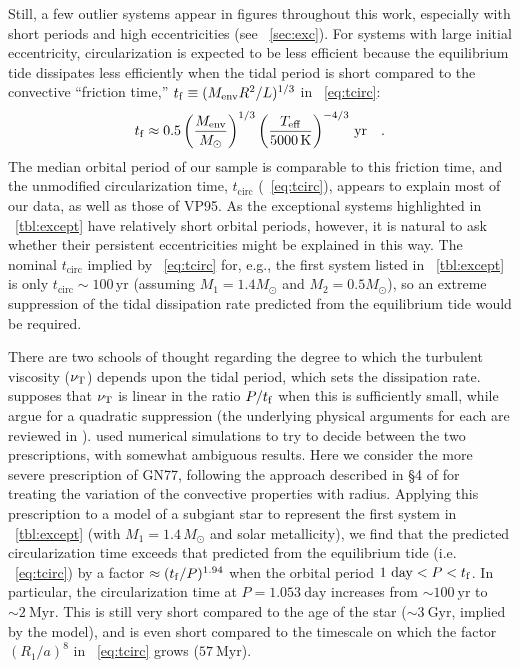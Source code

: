 \documentclass[modern, letterpaper]{aastex62}
\begin{document}
Still, a few outlier systems appear in figures throughout this work, especially with short periods and high eccentricities (see \sectionname~\ref{sec:exc}).
For systems with large initial eccentricity, circularization is expected to be less efficient because the equilibrium tide dissipates less efficiently when the tidal period is short compared to the convective ``friction time,'' $t_{\rm f}\equiv (M_{\rm env} R^2/L)^{1/3}$ in \eqname~\ref{eq:tcirc}:
\begin{equation}
  \label{eq:tfval}
  t_{\rm f} \approx 0.5\left(\frac{M_{\rm env}}{M_{\odot}}\right)^{1/3}\left(\frac{T_{\rm eff}}{5000\,\rm K}\right)^{-4/3}\,\mathrm{yr} \quad .
\end{equation}
The median orbital period of our sample is comparable to this friction time, and the unmodified circularization time, $t_\textrm{circ}$ (\eqname~\ref{eq:tcirc}), appears to explain most of our data, as well as those of VP95.
As the exceptional systems highlighted in \tablename~\ref{tbl:except} have relatively short orbital periods, however, it is natural to ask whether their persistent eccentricities might be explained in this way.
The nominal $t_\textrm{circ}$ implied by \eqname~\ref{eq:tcirc} for, e.g., the first system listed in \tablename~\ref{tbl:except} is only $t_\textrm{circ} \sim 100\,\textrm{yr}$ (assuming $M_1=1.4 M_\odot$ and $M_2 = 0.5 M_\odot$), so an extreme suppression of the tidal dissipation rate predicted from the equilibrium tide would be required.

There are two schools of thought regarding the degree to which the turbulent viscosity ($\nu_{\rm T}$) depends upon the tidal period, which sets the dissipation rate.
\citet{Zahn:1989} supposes that $\nu_{\rm T}$ is linear in the ratio $P/t_{\rm f}$ when this is sufficiently small, while \citet[hereafter GN77]{Goldreich+Nicholson77} argue for a quadratic suppression (the underlying physical arguments for each are reviewed in \citealt{Goodman:1997}).
\citet{Penev09} used numerical simulations to try to decide between the two prescriptions, with somewhat ambiguous results.
Here we consider the more severe prescription of GN77, following the approach described in \S4 of \cite{Goodman:1997} for treating the variation of the convective properties with radius.
Applying this prescription to a  model of a subgiant star to represent the first system in \tablename~\ref{tbl:except} (with $M_1=1.4\,M_\odot$ and solar metallicity), we find that the predicted circularization time exceeds that predicted from the equilibrium tide (i.e. \eqname~\ref{eq:tcirc}) by a factor $\approx (t_{\rm f}/P)^{1.94}$ when the orbital period $1~\mathrm{day} < P < t_{\rm f}$.
In particular, the circularization time at $P=1.053~\textrm{day}$ increases from $\sim100~\textrm{yr}$ to $\sim2~\textrm{Myr}$.
This is still very short compared to the age of the star ($\sim 3~\textrm{Gyr}$, implied by the  model), and is even short compared to the timescale on which the factor $(R_1/a)^8$ in \eqname~\ref{eq:tcirc} grows ($57~\textrm{Myr}$).
\end{document}
